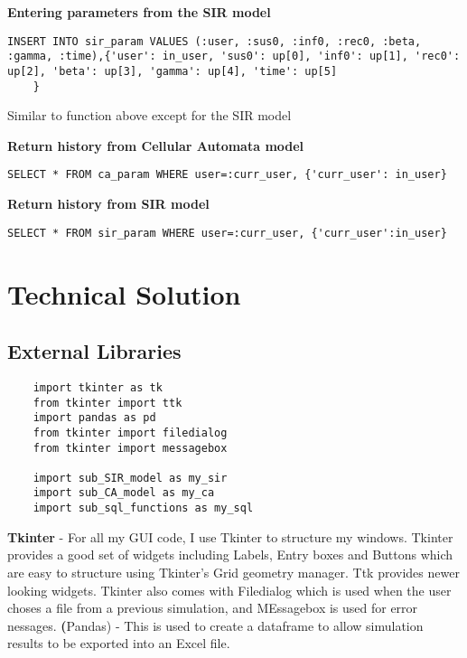 \documentclass[11pt, a4paper]{article}
\begin{document}
\textbf{Entering parameters from the SIR model}
\begin{lstlisting}
INSERT INTO sir_param VALUES (:user, :sus0, :inf0, :rec0, :beta, :gamma, :time),{'user': in_user, 'sus0': up[0], 'inf0': up[1], 'rec0': up[2], 'beta': up[3], 'gamma': up[4], 'time': up[5]
    }
\end{lstlisting}
Similar to function above except for the SIR model

\textbf{Return history from Cellular Automata model}
\begin{lstlisting}
SELECT * FROM ca_param WHERE user=:curr_user, {'curr_user': in_user}
\end{lstlisting}

\textbf{Return history from SIR model}
\begin{lstlisting}
SELECT * FROM sir_param WHERE user=:curr_user, {'curr_user':in_user}
\end{lstlisting}






\newpage
\section{Technical Solution}
\subsection{External Libraries}
\begin{lstlisting}
    import tkinter as tk
    from tkinter import ttk
    import pandas as pd
    from tkinter import filedialog
    from tkinter import messagebox

    import sub_SIR_model as my_sir
    import sub_CA_model as my_ca
    import sub_sql_functions as my_sql
\end{lstlisting}
\textbf{Tkinter} - For all my GUI code, I use Tkinter to structure my windows. Tkinter provides a good set of widgets including Labels, Entry boxes and Buttons which are easy to structure using Tkinter's Grid geometry manager. Ttk provides newer looking widgets. Tkinter also comes with Filedialog which is used when the user choses a file from a previous simulation, and MEssagebox is used for error nessages.
\textbf(Pandas) - This is used to create a dataframe to allow simulation results to be exported into an Excel file.
\end{document}
